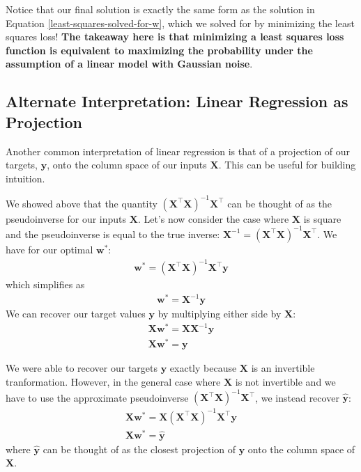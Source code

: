 Notice that our final solution is exactly the same form as the solution in Equation \ref{least-squares-solved-for-w}, which we solved for by minimizing the least squares loss! \textbf{The takeaway here is that minimizing a least squares loss function is equivalent to maximizing the probability under the assumption of a linear model with Gaussian noise}.

\subsection{Alternate Interpretation: Linear Regression as Projection}
Another common interpretation of linear regression is that of a projection of our targets, $\textbf{y}$, onto the column space of our inputs $\textbf{X}$. This can be useful for building intuition.

We showed above that the quantity $(\textbf{X}^\top\textbf{X})^{-1}\textbf{X}^\top$ can be thought of as the pseudoinverse for our inputs $\textbf{X}$. Let's now consider the case where $\textbf{X}$ is square and the pseudoinverse is equal to the true inverse: $\textbf{X}^{-1} = (\textbf{X}^\top\textbf{X})^{-1}\textbf{X}^\top$. We have for our optimal $\textbf{w}^{*}$:
\begin{align*}
    \textbf{w}^{*} = (\textbf{X}^\top\textbf{X})^{-1}\textbf{X}^\top\textbf{y}
\end{align*}
which simplifies as
\begin{align*}
    \textbf{w}^{*} = \textbf{X}^{-1}\textbf{y}
\end{align*}
We can recover our target values $\textbf{y}$ by multiplying either side by $\textbf{X}$:
\begin{align*}
    \textbf{X}\textbf{w}^{*} = \textbf{X}\textbf{X}^{-1}\textbf{y} \\
    \textbf{X}\textbf{w}^{*} = \textbf{y}
\end{align*}

We were able to recover our targets $\textbf{y}$ exactly because $\textbf{X}$ is an invertible tranformation. However, in the general case where $\textbf{X}$ is not invertible and we have to use the approximate pseudoinverse $(\textbf{X}^\top\textbf{X})^{-1}\textbf{X}^\top$, we instead recover $\hat{\textbf{y}}$:
\begin{align*}
    \textbf{X}\textbf{w}^{*} = \textbf{X}(\textbf{X}^\top\textbf{X})^{-1}\textbf{X}^\top\textbf{y} \\
    \textbf{X}\textbf{w}^{*} = \hat{\textbf{y}}
\end{align*}
where $\hat{\textbf{y}}$ can be thought of as the closest projection of $\textbf{y}$ onto the column space of $\textbf{X}$.


